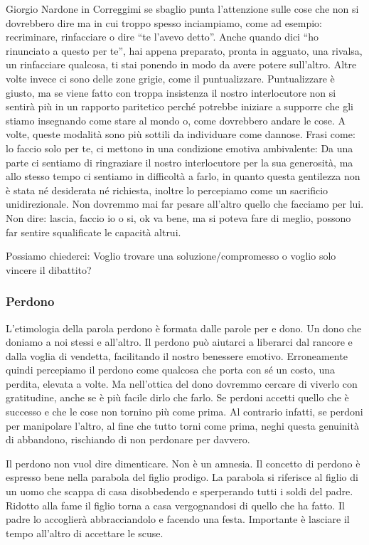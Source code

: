 \documentclass[12pt]{book} %
\begin{document}
Giorgio Nardone in Correggimi se sbaglio punta
l'attenzione sulle cose che non si dovrebbero dire ma in cui troppo spesso inciampiamo, come ad
esempio: recriminare, rinfacciare o dire “te l'avevo detto”. Anche quando dici “ho rinunciato a questo per te”, hai
appena preparato, pronta in agguato, una rivalsa, un rinfacciare qualcosa, ti stai ponendo in modo da avere potere
sull'altro. Altre volte invece ci sono delle zone grigie, come il puntualizzare. Puntualizzare è giusto, ma se viene
fatto con troppa insistenza il nostro interlocutore non si sentirà più in un rapporto paritetico perché potrebbe
iniziare a supporre che gli stiamo insegnando come stare al mondo o, come dovrebbero andare le cose. A volte, queste
modalità sono più sottili da individuare come dannose. Frasi come: lo faccio solo per te, ci mettono in una condizione
emotiva ambivalente: Da una parte ci sentiamo di ringraziare il nostro interlocutore per la sua generosità, ma allo
stesso tempo ci sentiamo in difficoltà a farlo, in quanto questa gentilezza non è stata né desiderata né
richiesta, inoltre lo percepiamo come un sacrificio unidirezionale. Non dovremmo mai far pesare
all'altro quello che facciamo per lui. Non dire: lascia, faccio io o si, ok va bene, ma si poteva
fare di meglio, possono far sentire squalificate le capacità altrui.

Possiamo chiederci: Voglio trovare una soluzione/compromesso o voglio solo vincere il dibattito? 

\subsubsection{Perdono}
L'etimologia della parola perdono è formata dalle parole per e dono. Un dono che doniamo a noi
stessi e all'altro. Il perdono può aiutarci a liberarci dal rancore e dalla voglia di vendetta, facilitando il nostro benessere emotivo. Erroneamente quindi percepiamo il
perdono come qualcosa che porta con sé un costo, una perdita, elevata a volte. Ma nell'ottica del
dono dovremmo cercare di viverlo con gratitudine, anche se è più facile dirlo che farlo. Se perdoni accetti quello
che è successo e che le cose non tornino più come prima. Al contrario infatti, se perdoni per manipolare l'altro, al
fine che tutto torni come prima, neghi questa genuinità di abbandono, rischiando di non perdonare per davvero.

Il perdono non vuol dire dimenticare. Non è un amnesia. Il concetto di perdono è espresso bene nella parabola del figlio
prodigo. La parabola si riferisce al figlio di un uomo che scappa di casa
disobbedendo e sperperando tutti i soldi del padre. Ridotto alla fame il figlio torna a casa vergognandosi di quello
che ha fatto. Il padre lo accoglierà abbracciandolo e facendo una festa. Importante è lasciare il tempo
all'altro di accettare le scuse.
\end{document}

